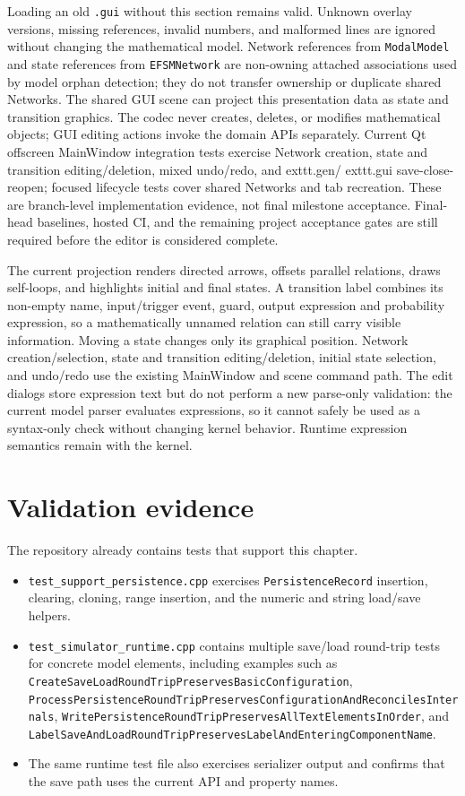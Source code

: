 Loading an old \texttt{.gui} without this section remains valid. Unknown
overlay versions, missing references, invalid numbers, and malformed lines
are ignored without changing the mathematical model. Network references from
\texttt{ModalModel} and state references from \texttt{EFSMNetwork} are
non-owning attached associations used by model orphan detection; they do not
transfer ownership or duplicate shared Networks. The shared GUI scene can
project this presentation data as state and transition graphics. The codec
never creates, deletes, or modifies mathematical objects; GUI editing actions
invoke the domain APIs separately. Current Qt offscreen MainWindow integration
tests exercise Network creation, state and transition editing/deletion, mixed
undo/redo, and 	exttt{.gen}/	exttt{.gui} save-close-reopen; focused lifecycle
tests cover shared Networks and tab recreation. These are branch-level
implementation evidence, not final milestone acceptance. Final-head baselines,
hosted CI, and the remaining project acceptance gates are still required before
the editor is considered complete.

The current projection renders directed arrows, offsets parallel relations,
draws self-loops, and highlights initial and final states. A transition label
combines its non-empty name, input/trigger event, guard, output expression and
probability expression, so a mathematically unnamed relation can still carry
visible information. Moving a state changes only its graphical position.
Network creation/selection, state and transition editing/deletion, initial
state selection, and undo/redo use the existing MainWindow and scene command
path. The edit dialogs store expression text but do not perform a new
parse-only validation: the current model parser evaluates expressions, so it
cannot safely be used as a syntax-only check without changing kernel behavior.
Runtime expression semantics remain with the kernel.

\section{Validation evidence}
\label{sec:model-persistence-validation}

The repository already contains tests that support this chapter.
\begin{itemize}
\item \texttt{test\_support\_persistence.cpp} exercises
      \texttt{PersistenceRecord} insertion, clearing, cloning, range insertion,
      and the numeric and string load/save helpers.
\item \texttt{test\_simulator\_runtime.cpp} contains multiple save/load
      round-trip tests for concrete model elements, including examples such as
      \texttt{CreateSaveLoadRoundTripPreservesBasicConfiguration},
      \texttt{ProcessPersistenceRoundTripPreservesConfigurationAndReconcilesInternals},
      \texttt{WritePersistenceRoundTripPreservesAllTextElementsInOrder}, and
      \texttt{LabelSaveAndLoadRoundTripPreservesLabelAndEnteringComponentName}.
\item The same runtime test file also exercises serializer output and confirms
      that the save path uses the current API and property names.
\end{itemize}

